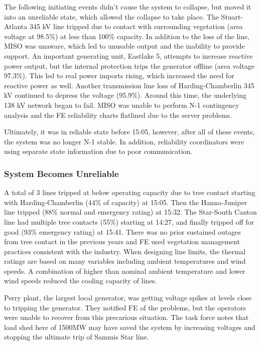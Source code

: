 The following initiating events didn't cause the system to collapse, but moved it into an unreliable state, which allowed the collapse to take place. The Stuart-Atlanta 345 kV line tripped due to contact with surrounding vegetation (area voltage at 98.5\%) at less than 100\% capacity.  In addition to the loss of the line, MISO was unaware, which led to unusable output and the inability to provide support.  An important generating unit, Eastlake 5, attempts to increase reactive power output, but the internal protection trips the generator offline (area voltage 97.3\%).  This led to real power imports rising, which increased the need for reactive power as well.  Another transmission line loss of Harding-Chamberlin 345 kV continued to depress the voltage (95.9\%).  Around this time, the underlying 138 kV network began to fail.   MISO was unable to perform N-1 contingency analysis and the FE reliability charts flatlined due to the server problems.

Ultimately, it was in reliable state before 15:05, however, after all of these events, the system was no longer N-1 stable.  In addition, reliability coordinators were using separate state information due to poor communication.  

\subsubsection{System Becomes Unreliable}

A total of 3 lines tripped at below operating capacity due to tree contact starting with Harding-Chamberlin (44\% of capacity) at 15:05.  Then the Hanna-Juniper line tripped (88\% normal and emergency rating) at 15:32.  The Star-South Canton line had multiple tree contacts (55\%) starting at 14:27, and finally tripped off for good (93\% emergency rating)  at 15:41.  There was no prior sustained outages from tree contact in the previous years and FE used vegetation management practices consistent with the industry.  When designing line limits, the thermal ratings are based on many variables including ambient temperatures and wind speeds.  A combination of higher than nominal ambient temperature and lower wind speeds reduced the cooling capacity of lines.

Perry plant, the largest local generator, was getting voltage spikes at levels close to tripping the generator.  They notified FE of the problems, but the operators were unable to recover from this precarious situation.  The task force notes that load shed here of 1500MW may have saved the system by increasing voltages and stopping the ultimate trip of Sammis Star line.

